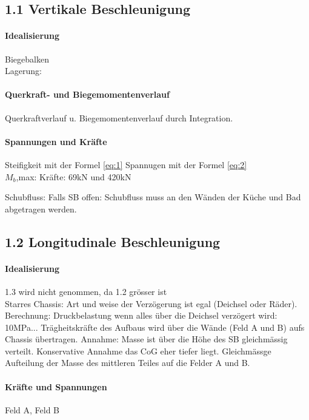 \subsection{1.1 Vertikale Beschleunigung}
\paragraph{Idealisierung}
Biegebalken\\
Lagerung:\\

\paragraph{Querkraft- und Biegemomentenverlauf}
Querkraftverlauf u. Biegemomentenverlauf durch Integration.\\

\paragraph{Spannungen und Kräfte}
Steifigkeit mit der Formel \ref{eq:1} Spannugen mit der Formel \ref{eq:2}\\
$M_b$,max: Kräfte: 69kN und 420kN

Schubfluss:
Falls SB offen: Schubfluss muss an den Wänden der Küche und Bad abgetragen werden.


\subsection{1.2 Longitudinale Beschleunigung}
\paragraph{Idealisierung}
1.3 wird nicht genommen, da 1.2 grösser ist\\
Starres Chassis: Art und weise der Verzögerung ist egal (Deichsel oder Räder). Berechnung: Druckbelastung wenn alles über die Deichsel verzögert wird: 10MPa...
Trägheitskräfte des Aufbaus wird über die Wände (Feld A und B) aufs Chassis übertragen.
Annahme: Masse ist über die Höhe des SB gleichmässig verteilt. Konservative Annahme das CoG eher tiefer liegt.
Gleichmässge Aufteilung der Masse des mittleren Teiles auf die Felder A und B.

\paragraph{Kräfte und Spannungen}
Feld A, Feld B

